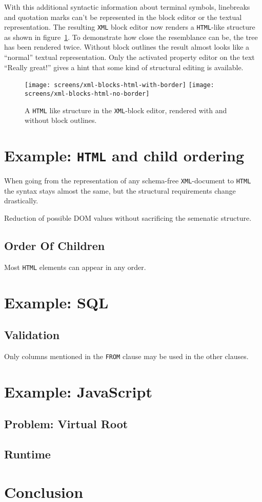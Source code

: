 \documentclass[sigconf,natbib=false,review=true]{acmart}
\begin{document}
With this additional syntactic information about terminal symbols, linebreaks and quotation marks can't be represented in the block editor or the textual representation. The resulting \texttt{XML} block editor now renders a \texttt{HTML}-like structure as shown in figure~\ref{fig:screen-editor-xml-no-border}. To demonstrate how close the resemblance can be, the tree has been rendered twice. Without block outlines the result almost looks like a \enquote{normal} textual representation. Only the activated property editor on the text \enquote{Really great!} gives a hint that some kind of structural editing is available.

\begin{figure}
  \texttt{[image: screens/xml-blocks-html-with-border]}
  \texttt{[image: screens/xml-blocks-html-no-border]}
  \caption{A \texttt{HTML} like structure in the \texttt{XML}-block editor, rendered with and without block outlines.}
  \label{fig:screen-editor-xml-no-border}
\end{figure}

\section{Example: \texttt{HTML} and child ordering}

When going from the representation of any schema-free \texttt{XML}-document to \texttt{HTML} the syntax stays almost the same, but the structural requirements change drastically.

Reduction of possible DOM values without sacrificing the semenatic structure.

\subsection{Order Of Children}

Most \texttt{HTML} elements can appear in any order.

\section{Example: SQL}

\subsection{Validation}

Only columns mentioned in the \texttt{FROM} clause may be used in the other clauses.

\section{Example: JavaScript}

\subsection{Problem: Virtual Root}

\subsection{Runtime}

\section{Conclusion}

\printbibliography
\end{document}
